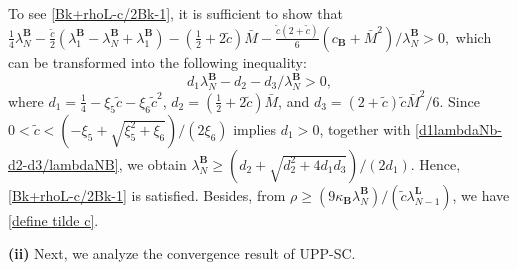 \documentclass[10pt,a4paper]{amsart}
\begin{document}
To see \eqref{Bk+rhoL-c/2Bk-1}, it is sufficient to show that $\frac{1}{4}\lambda_N^{\mathbf{B}}-\frac{\tilde{c}}{2}(\lambda_1^{\mathbf{B}}-\lambda_N^{\mathbf{B}}+\lambda_1^{\mathbf{B}})-(\frac{1}{2}+2\tilde{c})\bar{M}
-\frac{\tilde{c}(2+\tilde{c})}{6}(c_\mathbf{B}+\bar{M}^2)/\lambda_N^{\mathbf{B}}> 0,$
which can be transformed into the following inequality:
\begin{equation}\label{d1lambdaNb-d2-d3/lambdaNB}
	d_1\lambda_N^{\mathbf{B}}-d_2-d_3/\lambda_N^{\mathbf{B}} >0,
\end{equation}
where $d_1= \frac{1}{4}- \xi_5 \tilde{c}-\xi_6 \tilde{c}^2$, $d_2 = (\frac{1}{2}+2\tilde{c})\bar{M}$, and $d_3={(2+\tilde{c})\tilde{c}}\bar{M}^2/6$.
Since $0<\tilde{c}<({-\xi_5+\sqrt{\xi_5^2+\xi_6}})/({2\xi_6})$ implies $d_1>0$, together with \eqref{d1lambdaNb-d2-d3/lambdaNB}, we obtain $\lambda_N^{\mathbf{B}}\geq ({d_2+\sqrt{d_2^2+4d_1d_3}})/({2d_1})$. Hence, \eqref{Bk+rhoL-c/2Bk-1} is satisfied. Besides, from $\rho \geq ({9\kappa_{\mathbf{B}}\lambda_N^{\mathbf{B}}})/({\tilde{c}\lambda_{N-1}^{\mathbf{L}}})$, we have \eqref{define tilde c}.

\textbf{(ii)}
Next, we analyze the convergence result of UPP-SC. 
\end{document}
